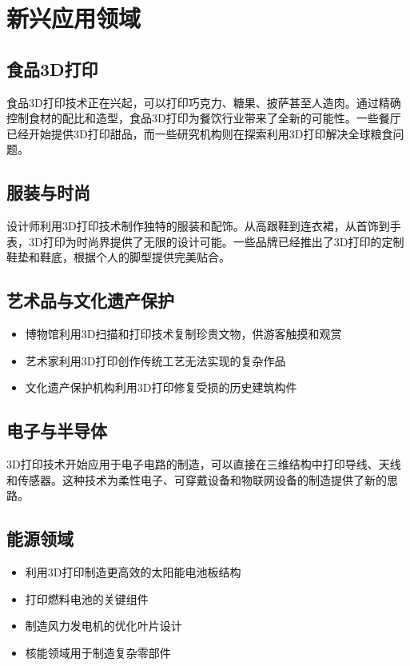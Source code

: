 \documentclass[12pt,UTF8]{ctexbook}
\begin{document}
\section{新兴应用领域}

\subsection{食品3D打印}
食品3D打印技术正在兴起，可以打印巧克力、糖果、披萨甚至人造肉。通过精确控制食材的配比和造型，食品3D打印为餐饮行业带来了全新的可能性。一些餐厅已经开始提供3D打印甜品，而一些研究机构则在探索利用3D打印解决全球粮食问题。

\subsection{服装与时尚}
设计师利用3D打印技术制作独特的服装和配饰。从高跟鞋到连衣裙，从首饰到手表，3D打印为时尚界提供了无限的设计可能。一些品牌已经推出了3D打印的定制鞋垫和鞋底，根据个人的脚型提供完美贴合。

\subsection{艺术品与文化遗产保护}
\begin{itemize}
\item 博物馆利用3D扫描和打印技术复制珍贵文物，供游客触摸和观赏
\item 艺术家利用3D打印创作传统工艺无法实现的复杂作品
\item 文化遗产保护机构利用3D打印修复受损的历史建筑构件
\end{itemize}

\subsection{电子与半导体}
3D打印技术开始应用于电子电路的制造，可以直接在三维结构中打印导线、天线和传感器。这种技术为柔性电子、可穿戴设备和物联网设备的制造提供了新的思路。

\subsection{能源领域}
\begin{itemize}
\item 利用3D打印制造更高效的太阳能电池板结构
\item 打印燃料电池的关键组件
\item 制造风力发电机的优化叶片设计
\item 核能领域用于制造复杂零部件
\end{itemize}
\end{document}
